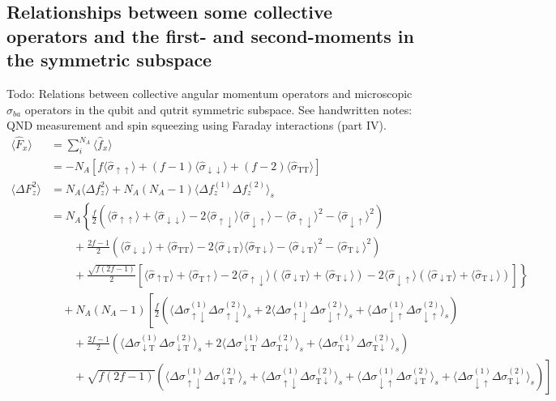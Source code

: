 \documentclass[preprint,aps,pra,onecolumn,superscriptaddress]{revtex4-1} %
\newcommand{\nn}{\nonumber}
\newcommand{\expect}[1]{\big\langle #1 \big\rangle}
\newcommand{\sigmauu}{\hat{\sigma}_{\uparrow\uparrow}}
\newcommand{\sigmaud}{\hat{\sigma}_{\uparrow\downarrow}}
\newcommand{\sigmaut}{\hat{\sigma}_{\uparrow \mathrm{T}}}
\newcommand{\sigmadu}{\hat{\sigma}_{\downarrow\uparrow}}
\newcommand{\sigmadd}{\hat{\sigma}_{\downarrow\downarrow}}
\newcommand{\sigmadt}{\hat{\sigma}_{\downarrow \mathrm{T}}}
\newcommand{\sigmatu}{\hat{\sigma}_{\mathrm{T}\uparrow}}
\newcommand{\sigmatd}{\hat{\sigma}_{\mathrm{T}\downarrow}}
\newcommand{\sigmatt}{\hat{\sigma}_{\mathrm{T}\mathrm{T}}}
\newcommand{\Dsigmaud}{\Delta\sigma_{\uparrow\downarrow}}
\newcommand{\Dsigmadu}{\Delta\sigma_{\downarrow\uparrow}}
\newcommand{\Dsigmadt}{\Delta\sigma_{\downarrow \mathrm{T}}}
\newcommand{\Dsigmatd}{\Delta\sigma_{\mathrm{T}\downarrow}}
\newcommand{\comment}[1]{{\color{Maroon} #1}}
\begin{document}
\begin{appendix}
\section{Relationships between some collective operators and the first- and second-moments in the symmetric subspace} \label{Appendix::collectivespinoperators}

\comment{Todo: Relations between collective angular momentum operators and microscopic $\sigma_{ba}$ operators in the qubit and qutrit symmetric subspace. See handwritten notes: QND measurement and spin squeezing using Faraday interactions (part IV).}
\begin{subequations}
	\begin{align}
	\expect{\hat{F}_x} &= \sum_i^{N_A}\expect{\hat{f}_x}\nonumber\\
	&= -N_A \left[f\expect{\sigmauu}+(f-1)\expect{\sigmadd}+(f-2)\expect{\sigmatt } \right]\label{eq:Fx_qutrit}\\
	\expect{\Delta F_z^2} &= N_A\expect{\Delta f_z^2} + N_A(N_A-1)\expect{\Delta f_z^{(1)}\Delta f_z^{(2)} }_s\nn\\
	&=N_A\left\{ \frac{f}{2}\left(\expect{\sigmauu}+\expect{\sigmadd}-2\expect{\sigmaud}\expect{\sigmadu}-\expect{\sigmaud}^2-\expect{\sigmadu}^2 \right)\right. \label{eq:DeltaFz2_fz}\\
	&\quad\quad+ \frac{2f-1}{2}\left(\expect{\sigmadd}+\expect{\sigmatt}-2\expect{\sigmadt}\expect{\sigmatd}-\expect{\sigmadt}^2-\expect{\sigmatd}^2 \right)\nn\\
	&\quad\quad +\left. \frac{\sqrt{f(2f-1)}}{2}\left[\expect{\sigmaut }+\expect{\sigmatu} -2\expect{\sigmaud}(\expect{\sigmadt}+\expect{\sigmatd}) -2\expect{\sigmadu}(\expect{\sigmadt}+\expect{\sigmatd} ) \right] \right\}\nn\\
	&\quad +N_A(N_A-1)\left[\frac{f}{2}(\expect{\Dsigmaud^{(1)}\Dsigmaud^{(2)} }_s +2\expect{\Dsigmaud^{(1)}\Dsigmadu^{(2)} }_s+\expect{\Dsigmadu^{(1)}\Dsigmadu^{(2)} }_s )\right.\label{eq:DeltaFz2_qutrit}\\
	&\quad\quad + \frac{2f-1}{2}(\expect{\Dsigmadt^{(1)}\Dsigmadt^{(2)} }_s +2\expect{\Dsigmadt^{(1)}\Dsigmatd^{(2)} }_s +\expect{\Dsigmatd^{(1)}\Dsigmatd^{(2)} }_s) \nn\\
	&\quad\quad + \left. \sqrt{f(2f-1)}(\expect{\Dsigmaud^{(1)}\Dsigmadt^{(2)} }_s +\expect{\Dsigmaud^{(1)}\Dsigmatd^{(2)} }_s +\expect{\Dsigmadu^{(1)}\Dsigmadt^{(2)} }_s+\expect{\Dsigmadu^{(1)}\Dsigmatd^{(2)} }_s )\right]\nn
	\end{align}
\end{subequations}


\end{appendix}
\end{document}
